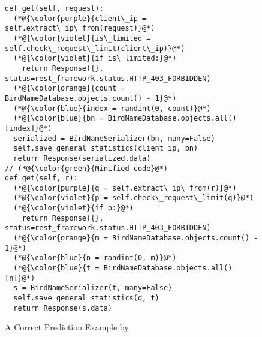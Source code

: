 \begin{figure}[t]
	\centering {} \begin{lstlisting}[]
def get(self, request):
  (*@{\color{purple}{client\_ip = self.extract\_ip\_from(request)}@*)
  (*@{\color{violet}{is\_limited = self.check\_request\_limit(client\_ip)}@*)
  (*@{\color{violet}{if is\_limited:}@*)
    return Response({}, status=rest_framework.status.HTTP_403_FORBIDDEN)
  (*@{\color{orange}{count = BirdNameDatabase.objects.count() - 1}@*)
  (*@{\color{blue}{index = randint(0, count)}@*)
  (*@{\color{blue}{bn = BirdNameDatabase.objects.all()[index]}@*)
  serialized = BirdNameSerializer(bn, many=False)
  self.save_general_statistics(client_ip, bn)
  return Response(serialized.data)
// (*@{\color{green}{Minified code}@*)
def get(self, r):
  (*@{\color{purple}{q = self.extract\_ip\_from(r)}@*)
  (*@{\color{violet}{p = self.check\_request\_limit(q)}@*)
  (*@{\color{violet}{if p:}@*)
    return Response({}, status=rest_framework.status.HTTP_403_FORBIDDEN)
  (*@{\color{orange}{m = BirdNameDatabase.objects.count() - 1}@*)
  (*@{\color{blue}{n = randint(0, m)}@*)
  (*@{\color{blue}{t = BirdNameDatabase.objects.all()[n]}@*)
  s = BirdNameSerializer(t, many=False)
  self.save_general_statistics(q, t)
  return Response(s.data)       
\end{lstlisting}
\vspace{-18pt}
\caption{A Correct Prediction Example by {\tool}}
\vspace{-4pt}
\label{example1}
\end{figure}



